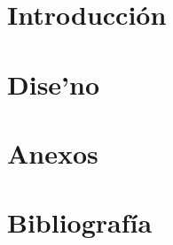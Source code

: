 \documentclass[12pt,oneside,final]{unitesis}
\begin{document}




\newpage
{}

\tableofcontents

\listoffigures

\listoftables
\newpage
\startarabicpagination

\part{Introducci\'on}


\part{Dise'no}



%
%
%
%
%


%



\part{Anexos}
\appendix
%
%
%
%
%
%

\part{Bibliograf\'ia}


%


%
\end{document}
